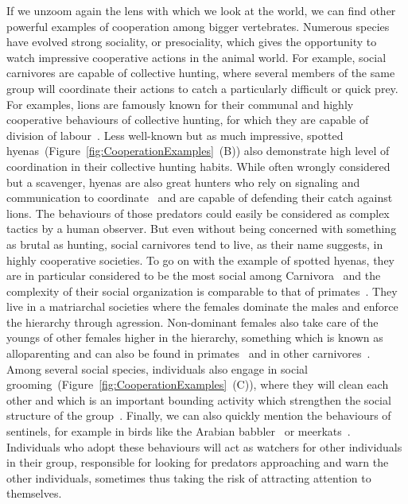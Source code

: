    If we unzoom again the lens with which we look at the world, we can find other powerful examples of cooperation among bigger vertebrates. Numerous species have evolved strong sociality, or presociality, which gives the opportunity to watch impressive cooperative actions in the animal world. For example, social carnivores are capable of collective hunting, where several members of the same group will coordinate their actions to catch a particularly difficult or quick prey. For examples, lions are famously known for their communal and highly cooperative behaviours of collective hunting, for which they are capable of division of labour~\parencite{Scheel1991, Stander1992}. Less well-known but as much impressive, spotted hyenas~(Figure~\ref{fig:CooperationExamples}~(B)) also demonstrate high level of coordination in their collective hunting habits. While often wrongly considered but a scavenger, hyenas are also great hunters who rely on signaling and communication to coordinate~\parencite{Drea2009a, Smith2010, Smith2012a} and are capable of defending their catch against lions. The behaviours of those predators could easily be considered as complex tactics by a human observer. But even without being concerned with something as brutal as hunting, social carnivores tend to live, as their name suggests, in highly cooperative societies. To go on with the example of spotted hyenas, they are in particular considered to be the most social among Carnivora~\parencite{Mills2003} and the complexity of their social organization is comparable to that of primates~\parencite{Drea2003}. They live in a matriarchal societies where the females dominate the males and enforce the hierarchy through agression. Non-dominant females also take care of the youngs of other females higher in the hierarchy, something which is known as alloparenting and can also be found in primates~\parencite{Small1990} and in other carnivores~\parencite{Packer2001}. Among several social species, individuals also engage in social grooming~(Figure~\ref{fig:CooperationExamples}~(C)), where they will clean each other and which is an important bounding activity which strengthen the social structure of the group~\parencite{Spruijt1992}. Finally, we can also quickly mention the behaviours of sentinels, for example in birds like the Arabian babbler~\parencite{Wright2001} or meerkats~\parencite{CluttonBrock1999}. Individuals who adopt these behaviours will act as watchers for other individuals in their group, responsible for looking for predators approaching and warn the other individuals, sometimes thus taking the risk of attracting attention to themselves.

